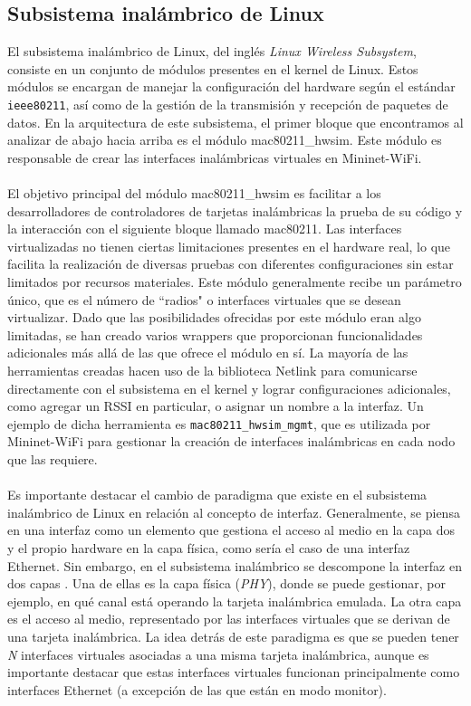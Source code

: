 \subsection{Subsistema inalámbrico de Linux}
\label{linux_w}

El subsistema inalámbrico de Linux, del inglés \textit{Linux Wireless Subsystem}, consiste en un conjunto de módulos presentes en el kernel de Linux. Estos módulos se encargan de manejar la configuración del hardware según el estándar \texttt{ieee80211}, así como de la gestión de la transmisión y recepción de paquetes de datos. En la arquitectura de este subsistema, el primer bloque que encontramos al analizar de abajo hacia arriba es el módulo mac80211\_hwsim. Este módulo es responsable de crear las interfaces inalámbricas virtuales en Mininet-WiFi.\\
\\
El objetivo principal del módulo mac80211\_hwsim es facilitar a los desarrolladores de controladores de tarjetas inalámbricas la prueba de su código y la interacción con el siguiente bloque llamado mac80211. Las interfaces virtualizadas no tienen ciertas limitaciones presentes en el hardware real, lo que facilita la realización de diversas pruebas con diferentes configuraciones sin estar limitados por recursos materiales. Este módulo generalmente recibe un parámetro único, que es el número de ``radios" o interfaces virtuales que se desean virtualizar. Dado que las posibilidades ofrecidas por este módulo eran algo limitadas, se han creado varios wrappers que proporcionan funcionalidades adicionales más allá de las que ofrece el módulo en sí. La mayoría de las herramientas creadas hacen uso de la biblioteca Netlink para comunicarse directamente con el subsistema en el kernel y lograr configuraciones adicionales, como agregar un RSSI en particular, o asignar un nombre a la interfaz. Un ejemplo de dicha herramienta es \texttt{mac80211\_hwsim\_mgmt}, que es utilizada por Mininet-WiFi para gestionar la creación de interfaces inalámbricas en cada nodo que las requiere.\\
\\
Es importante destacar el cambio de paradigma que existe en el subsistema inalámbrico de Linux en relación al concepto de interfaz. Generalmente, se piensa en una interfaz como un elemento que gestiona el acceso al medio en la capa dos y el propio hardware en la capa física, como sería el caso de una interfaz Ethernet. Sin embargo, en el subsistema inalámbrico se descompone la interfaz en dos capas \cite{8330098}. Una de ellas es la capa física (\textit{PHY}), donde se puede gestionar, por ejemplo, en qué canal está operando la tarjeta inalámbrica emulada. La otra capa es el acceso al medio, representado por las interfaces virtuales que se derivan de una tarjeta inalámbrica. La idea detrás de este paradigma es que se pueden tener \textit{N} interfaces virtuales asociadas a una misma tarjeta inalámbrica, aunque es importante destacar que estas interfaces virtuales funcionan principalmente como interfaces Ethernet (a excepción de las que están en modo monitor).

